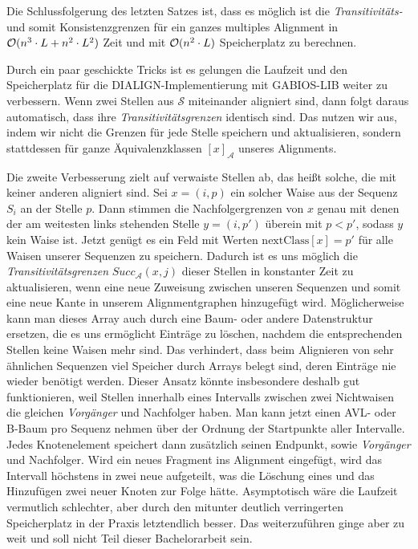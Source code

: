 Die Schlussfolgerung des letzten Satzes ist, dass es möglich ist die \emph{Transitivitäts-} und somit Konsistenzgrenzen für ein ganzes multiples Alignment in $\mathcal{O}(n^3\cdot L + n^2\cdot L^2)$ Zeit und mit $\mathcal{O}(n^2\cdot L)$ Speicherplatz zu berechnen. 

Durch ein paar geschickte Tricks ist es \cite{am00} gelungen die Laufzeit und den Speicherplatz für die DIALIGN-Implementierung mit GABIOS-LIB weiter zu verbessern. Wenn zwei Stellen aus $\mathcal{S}$ miteinander aligniert sind, dann folgt daraus automatisch, dass ihre \emph{Transitivitätsgrenzen} identisch sind. Das nutzen wir aus, indem wir nicht die Grenzen für jede Stelle speichern und aktualisieren, sondern stattdessen für ganze Äquivalenzklassen $[x]_{\mathcal{A}}$ unseres Alignments.

Die zweite Verbesserung zielt auf verwaiste Stellen ab, das heißt solche, die mit keiner anderen aligniert sind. Sei $x = (i,p)$ ein solcher Waise aus der Sequenz $S_i$ an der Stelle $p$. Dann stimmen die Nachfolgergrenzen von $x$ genau mit denen der am weitesten links stehenden Stelle $y = (i,p')$ überein mit $p < p'$, sodass $y$ kein Waise ist. 
Jetzt genügt es ein Feld mit Werten $\text{nextClass}[x] = p'$ für alle Waisen unserer Sequenzen zu speichern. Dadurch ist es uns möglich die \emph{Transitivitätsgrenzen} $Succ_{\mathcal{A}}(x,j)$ dieser Stellen in konstanter Zeit zu aktualisieren, wenn eine neue Zuweisung zwischen unseren Sequenzen und somit eine neue Kante in unserem Alignmentgraphen hinzugefügt wird. Möglicherweise kann man dieses Array auch durch eine Baum- oder andere Datenstruktur ersetzen, die es uns ermöglicht Einträge zu löschen, nachdem die entsprechenden Stellen keine Waisen mehr sind. Das verhindert, dass beim Alignieren von sehr ähnlichen Sequenzen viel Speicher durch Arrays belegt sind, deren Einträge nie wieder benötigt werden. Dieser Ansatz könnte insbesondere deshalb gut funktionieren, weil Stellen innerhalb eines Intervalls zwischen zwei Nichtwaisen die gleichen \emph{Vorgänger} und Nachfolger haben. Man kann jetzt einen AVL- oder B-Baum pro Sequenz nehmen über der Ordnung der Startpunkte aller Intervalle. Jedes Knotenelement speichert dann zusätzlich seinen Endpunkt, sowie \emph{Vorgänger} und Nachfolger. Wird ein neues Fragment ins Alignment eingefügt, wird das Intervall höchstens in zwei neue aufgeteilt, was die Löschung eines und das Hinzufügen zwei neuer Knoten zur Folge hätte. Asymptotisch wäre die Laufzeit vermutlich schlechter, aber durch den mitunter deutlich verringerten Speicherplatz in der Praxis letztendlich besser. Das weiterzuführen ginge aber zu weit und soll nicht Teil dieser Bachelorarbeit sein.

